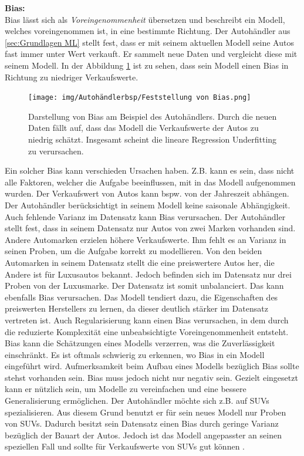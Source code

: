 \textbf{\gls{Bias}:}\\
\gls{Bias} lässt sich als \textit{Voreingenommenheit} übersetzen und beschreibt ein Modell, welches voreingenommen ist, in eine bestimmte Richtung. Der Autohändler aus \autoref{sec:Grundlagen ML} stellt fest, dass er mit seinem aktuellen Modell seine Autos fast immer unter Wert verkauft. Er sammelt neue Daten und vergleicht diese mit seinem Modell. In der Abbildung \ref{fig:BspBias} ist zu sehen, dass sein Modell einen \gls{Bias} in Richtung zu niedriger Verkaufswerte.

\begin{figure}[htbp]
    \centering
    \texttt{[image: img/Autohändlerbsp/Feststellung von Bias.png]}
    \caption[Darstellung von Bias am Beispiel des Autohändlers.]{Darstellung von Bias am Beispiel des Autohändlers. Durch die neuen Daten fällt auf, dass das Modell die Verkaufswerte der Autos zu niedrig schätzt. Insgesamt scheint die lineare Regression  \gls{Underfitting} zu verursachen.}
    \label{fig:BspBias}
\end{figure}

\clearpage
Ein solcher \gls{Bias} kann verschieden Ursachen haben. Z.B. kann es sein, dass nicht alle Faktoren, welcher die Aufgabe beeinflussen, mit in das Modell aufgenommen wurden. Der Verkaufswert von Autos kann bspw. von der Jahreszeit abhängen. Der Autohändler berücksichtigt in seinem Modell keine saisonale Abhängigkeit. Auch fehlende Varianz im Datensatz kann \gls{Bias} verursachen. Der Autohändler stellt fest, dass in seinem Datensatz nur Autos von zwei Marken vorhanden sind. Andere Automarken erzielen höhere Verkaufswerte. Ihm fehlt es an Varianz in seinen Proben, um die Aufgabe korrekt zu modellieren. Von den beiden Automarken in seinem Datensatz stellt die eine preiswertere Autos her, die Andere ist für Luxusautos bekannt. Jedoch  befinden sich im Datensatz nur drei Proben von der Luxusmarke. Der Datensatz ist somit unbalanciert. Das kann ebenfalls \gls{Bias} verursachen. Das Modell tendiert dazu, die Eigenschaften des preiswerten Herstellers zu lernen, da dieser deutlich stärker im Datensatz vertreten ist. Auch \gls{Regularisierung} kann einen \gls{Bias} verursachen, in dem durch die reduzierte Komplexität eine unbeabsichtigte Voreingenommenheit entsteht. \gls{Bias} kann die Schätzungen eines Modells verzerren, was die Zuverlässigkeit einschränkt. Es ist oftmals schwierig zu erkennen, wo \gls{Bias} in ein Modell eingeführt wird. Aufmerksamkeit beim Aufbau eines Modells bezüglich \gls{Bias} sollte stehst vorhanden sein. \gls{Bias} muss jedoch nicht nur negativ sein. Gezielt eingesetzt kann er nützlich sein, um Modelle zu vereinfachen und eine bessere \gls{Generalisierung} ermöglichen. Der Autohändler möchte sich z.B. auf SUVs spezialisieren. Aus diesem Grund benutzt er für sein neues Modell nur Proben von SUVs. Dadurch besitzt sein Datensatz einen \gls{Bias} durch geringe Varianz bezüglich der Bauart der Autos. Jedoch ist das Modell angepasster an seinen speziellen Fall und sollte für Verkaufswerte von SUVs gut  können \cite{Burkov.2019, Goodfellow.2016, Mehrabi.2019}. \dubpar


